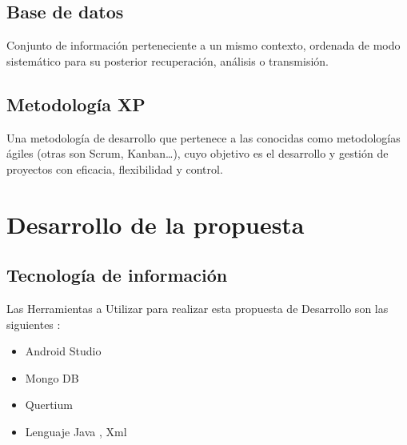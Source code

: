 \documentclass[preprint,12pt]{elsarticle}
\begin{document}
\subsection{Base de datos}
Conjunto de información perteneciente a un mismo contexto, ordenada de modo sistemático para su posterior recuperación, análisis o transmisión.
\subsection{Metodología XP}
Una metodología de desarrollo que pertenece a las conocidas como metodologías ágiles (otras son Scrum, Kanban…), cuyo objetivo es el desarrollo y gestión de proyectos con eficacia, flexibilidad y control.


\section{Desarrollo de la propuesta}
	\subsection{Tecnología de información }	
		Las Herramientas a Utilizar para realizar esta propuesta de Desarrollo son las siguientes :
		
	\begin{itemize}
    \item Android Studio 
    \item Mongo DB
    \item Quertium 
    \item Lenguaje Java , Xml
	\end{itemize}
\end{document}
